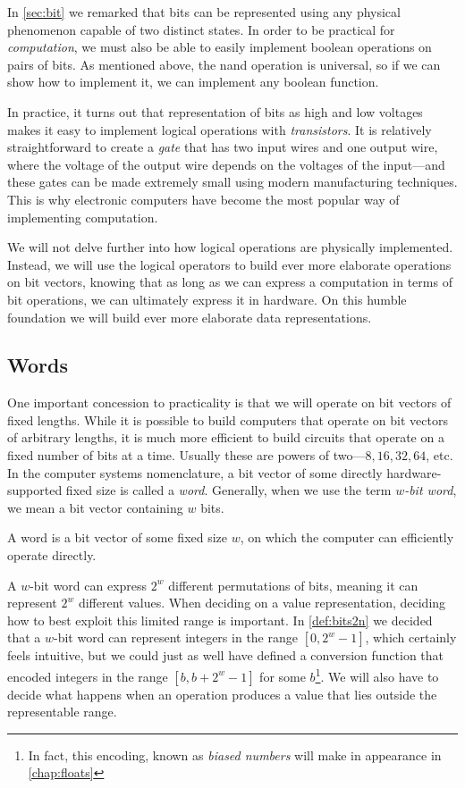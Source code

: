 In \cref{sec:bit} we remarked that bits can be represented using any
physical phenomenon capable of two distinct states.  In order to be
practical for \emph{computation}, we must also be able to easily
implement boolean operations on pairs of bits.  As mentioned above,
the nand operation is universal, so if we can show how to implement
it, we can implement any boolean function.

In practice, it turns out that representation of bits as high and low
voltages makes it easy to implement logical operations with
\emph{transistors}.  It is relatively straightforward to create a
\emph{gate} that has two input wires and one output wire, where the
voltage of the output wire depends on the voltages of the input---and
these gates can be made extremely small using modern manufacturing
techniques.  This is why electronic computers have become the most
popular way of implementing computation.

We will not delve further into how logical operations are physically
implemented.  Instead, we will use the logical operators to build ever
more elaborate operations on bit vectors, knowing that as long as we
can express a computation in terms of bit operations, we can
ultimately express it in hardware.  On this humble foundation we will
build ever more elaborate data representations.

\subsection{Words}
\label{sec:words}

One important concession to practicality is that we will operate on
bit vectors of fixed lengths.  While it is possible to build computers
that operate on bit vectors of arbitrary lengths, it is much more
efficient to build circuits that operate on a fixed number of bits at
a time.  Usually these are powers of two---$8,16,32,64$, etc.  In the
computer systems nomenclature, a bit vector of some directly
hardware-supported fixed size is called a \emph{word}.  Generally,
when we use the term \emph{$w$-bit word}, we mean a bit vector
containing $w$ bits.

\begin{definition}[Word]
  A word is a bit vector of some fixed size $w$, on which the computer
  can efficiently operate directly.
\end{definition}

A $w$-bit word can express $2^{w}$ different permutations of bits,
meaning it can represent $2^{w}$ different values.  When deciding on a
value representation, deciding how to best exploit this limited range
is important.  In \cref{def:bits2n} we decided that a $w$-bit word can
represent integers in the range $[0,2^{w}-1]$, which certainly feels
intuitive, but we could just as well have defined a conversion
function that encoded integers in the range $[b,b+2^{w}-1]$ for some
$b$\footnote{In fact, this encoding, known as \emph{biased numbers}
  will make in appearance in \cref{chap:floats}}.  We will also have
to decide what happens when an operation produces a value that lies
outside the representable range.


